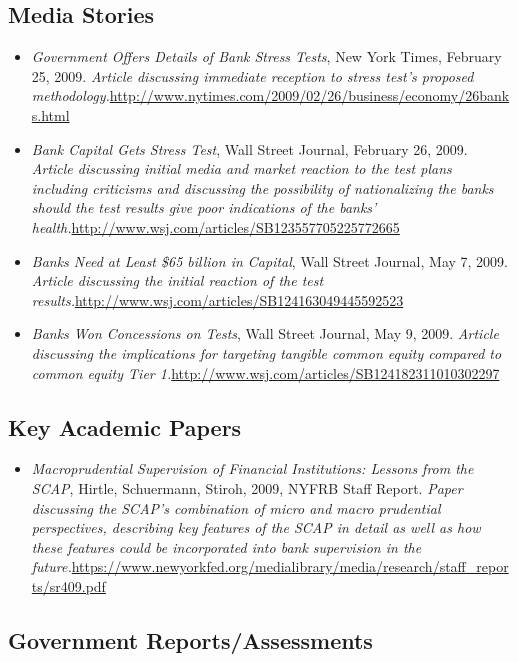 \documentclass[justified, nobib]{tufte-handout2}
\begin{document}
\subsection{Media Stories}

\begin{itemize}
\item
\emph{Government
  Offers Details of Bank Stress Tests}, New York Times, February 25,
  2009. \emph{Article discussing immediate reception to stress test's
  proposed methodology.}\url{http://www.nytimes.com/2009/02/26/business/economy/26banks.html}
\item
\emph{Bank
  Capital Gets Stress Test}, Wall Street Journal, February 26, 2009.
  \emph{Article discussing initial media and market reaction to the test
  plans including criticisms and discussing the possibility of
  nationalizing the banks should the test results give poor indications
  of the banks' health.}\url{http://www.wsj.com/articles/SB123557705225772665}
\item
\emph{Banks
  Need at Least \$65 billion in Capital}, Wall Street Journal, May 7,
  2009. \emph{Article discussing the initial reaction of the test
  results.}\url{http://www.wsj.com/articles/SB124163049445592523}
\item
\emph{Banks
  Won Concessions on Tests}, Wall Street Journal, May 9, 2009.
  \emph{Article discussing the implications for targeting tangible
  common equity compared to common equity Tier 1.}\url{http://www.wsj.com/articles/SB124182311010302297}
\end{itemize}

\subsection{Key Academic Papers}

\begin{itemize}
\item
\emph{Macroprudential
  Supervision of Financial Institutions: Lessons from the SCAP},
  Hirtle, Schuermann, Stiroh, 2009, NYFRB Staff Report. \emph{Paper
  discussing the SCAP's combination of micro and macro prudential
  perspectives, describing key features of the SCAP in detail as well as
  how these features could be incorporated into bank supervision in the
  future.}\url{https://www.newyorkfed.org/medialibrary/media/research/staff_reports/sr409.pdf}
\end{itemize}

\subsection{Government Reports/Assessments}
\end{document}
